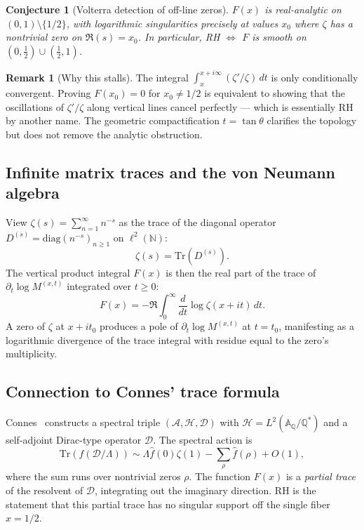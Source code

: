\documentclass[%
 aip,
 amsmath,amssymb,
 reprint,%
]{revtex4-1}
\theoremstyle{plain}
\newtheorem{conjecture}{Conjecture}[section]
\theoremstyle{definition}
\newtheorem{remark}[theorem]{Remark}
\newcommand{\N}{\mathbb{N}}
\newcommand{\Q}{\mathbb{Q}}
\newcommand{\A}{\mathbb{A}}
\begin{document}
\begin{conjecture}[Volterra detection of off-line zeros]\label{conj:volterra}
$F(x)$ is real-analytic on $(0,1)\setminus\{1/2\}$, with logarithmic
singularities precisely at values $x_0$ where $\zeta$ has a nontrivial zero on
$\Re(s) = x_0$. In particular, RH $\Leftrightarrow$ $F$ is smooth on
$(0,\tfrac12)\cup(\tfrac12,1)$.
\end{conjecture}

\begin{remark}[Why this stalls]
The integral $\int_x^{x+i\infty}(\zeta'/\zeta)\,dt$ is only conditionally
convergent. Proving $F(x_0) = 0$ for $x_0 \neq 1/2$ is equivalent to showing
that the oscillations of $\zeta'/\zeta$ along vertical lines cancel
perfectly --- which is essentially RH by another name. The geometric
compactification $t = \tan\theta$ clarifies the topology but does not remove
the analytic obstruction.
\end{remark}

\subsection{Infinite matrix traces and the von Neumann algebra}

View $\zeta(s) = \sum_{n=1}^\infty n^{-s}$ as the trace of the diagonal operator
$D^{(s)} = \mathrm{diag}(n^{-s})_{n\geq 1}$ on $\ell^2(\N)$:
\[
\zeta(s) = \mathrm{Tr}(D^{(s)}).
\]
The vertical product integral $F(x)$ is then the real part of the trace of
$\partial_t \log M^{(x,t)}$ integrated over $t \geq 0$:
\[
F(x) = -\Re\int_0^\infty \frac{d}{dt}\log\zeta(x+it)\,dt.
\]
A zero of $\zeta$ at $x+it_0$ produces a pole of $\partial_t\log M^{(x,t)}$ at
$t=t_0$, manifesting as a logarithmic divergence of the trace integral with
residue equal to the zero's multiplicity.

\subsection{Connection to Connes' trace formula}

Connes~\cite{Connes1999} constructs a spectral triple
$(\mathcal{A}, \mathcal{H}, \mathcal{D})$ with $\mathcal{H} = L^2(\A_\Q/\Q^*)$
and a self-adjoint Dirac-type operator $\mathcal{D}$. The spectral action is
\[
\mathrm{Tr}(f(\mathcal{D}/\Lambda))
\sim \Lambda\hat{f}(0)\zeta(1) - \sum_\rho \hat{f}(\rho) + O(1),
\]
where the sum runs over nontrivial zeros $\rho$.
The function $F(x)$ is a \emph{partial trace} of the resolvent of $\mathcal{D}$,
integrating out the imaginary direction.  RH is the statement that this partial
trace has no singular support off the single fiber $x = 1/2$.
\end{document}
